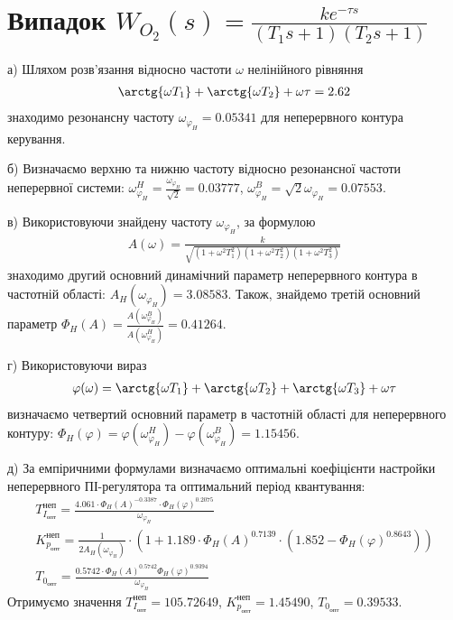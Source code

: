\section{Випадок \texorpdfstring{$W_{O_2}(s) = \frac{k e^{-\tau s}}{(T_1 s + 1)(T_2 s + 1)}$}{2}}
а)\;  Шляхом розв'язання відносно частоти $\omega$ нелінійного рівняння
\begin{gather}
    \arctg{\omega T_1} + \arctg{\omega T_2} + \omega \tau = 2.62
\end{gather}
знаходимо резонансну частоту $\omega_{\varphi_H} = 0.05341$ для неперервного контура керування.

б)\;  Визначаємо верхню та нижню частоту відносно резонансної частоти неперервної системи:
$\omega_{\varphi_H}^H = \frac{\omega_{\varphi_H}}{\sqrt{2}} = 0.03777$, 
$\omega_{\varphi_H}^B = {\sqrt{2}}{\omega_{\varphi_H}} = 0.07553$.

в)\; Використовуючи знайдену частоту $\omega_{\varphi_H}$, за формулою
\begin{gather}
    A(\omega) = \frac{k}{\sqrt{\left(1+\omega^2 T_1^2\right)\left(1+\omega^2 T_2^2\right)\left(1+\omega^2 T_3^2\right)}}
\end{gather}
знаходимо другий основний динамічний параметр неперервного контура в частотній області:
$A_H\left(\omega_{\varphi_H}\right) = 3.08583$. Також, знайдемо третій основний параметр
$\Phi_H(A) = \frac{A\left(\omega_{\varphi_H}^B\right)}{A\left(\omega_{\varphi_H}^H\right)} = 0.41264$.

г)\; Використовуючи вираз 
\begin{gather}
    \varphi(\omega) = \arctg{\omega T_1} + \arctg{\omega T_2} + \arctg{\omega T_3} + \omega \tau
\end{gather}
визначаємо четвертий основний параметр в частотній області для неперервного контуру:
$\Phi_H(\varphi) = \varphi\left(\omega_{\varphi_H}^H\right) - \varphi\left(\omega_{\varphi_H}^B\right) = 1.15456$.

д)\; За емпіричними формулами визначаємо оптимальні коефіцієнти настройки неперервного ПІ-регулятора
та оптимальний період квантування:
\begin{gather}
    T_{I_{\text{опт}}}^{\text{неп}} = 
    \frac{4.061 \cdot \Phi_H(A)^{-0.3387} \cdot \Phi_H(\varphi)^{0.2075}}{\omega_{\varphi_H}} \\
    K_{p_{\text{опт}}}^{\text{неп}} = \frac{1}{2 A_H\left(\omega_{\varphi_H}\right)}
    \cdot \left(
        1 + 1.189 \cdot \Phi_H(A)^{0.7139}\cdot \left(1.852 - \Phi_H(\varphi)^{0.8643}\right)
    \right) \\
    T_{0_{\text{опт}}} = \frac{
        0.5742 \cdot \Phi_H(A)^{0.5742} \Phi_H(\varphi)^{0.9394}
    }{\omega_{\varphi_H}}
\end{gather}
Отримуємо значення
$T_{I_{\text{опт}}}^{\text{неп}} = 105.72649$, $K_{p_{\text{опт}}}^{\text{неп}} = 1.45490$,
$T_{0_{\text{опт}}} = 0.39533$.

